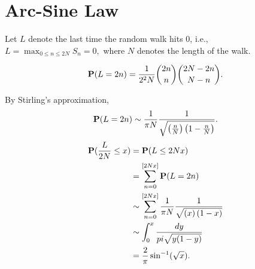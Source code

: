 \documentclass[main]{subfiles}
\begin{document}
\section{Arc-Sine Law}
Let $L$ denote the last time the random walk hits 0, i.e., $L=\max_{0\leq n \leq 2N} {S_n=0},$ where $N$ denotes the length of the walk.
\begin{theorem}
    $$\P(L=2n)=\frac{1}{2^2N}\binom{2n}{n}\binom{2N-2n}{N-n}.$$
    \label{thm:arcsin}
\end{theorem}
\begin{remark}
    By Stirling's approximation,
    $$\P(L=2n)\sim \frac{1}{\pi N}\frac{1}{\sqrt{\left(\frac{n}{N}\right)\left(1-\frac{n}{N}\right)}}.$$
    $$
        \begin{aligned}
            \P(\frac{L}{2N}\leq x) & =\P(L\leq 2Nx)                                                                         \\
                                   & =\sum_{n=0}^{[2Nx]}\P(L=2n)                                                            \\
                                   & \sim \sum_{n=0}^{[2Nx]} \frac{1}{\pi N}\frac{1}{\sqrt{\left(x\right)\left(1-x\right)}} \\
                                   & \sim \int_{0}^{x}\frac{dy}{pi\sqrt{y(1-y)}}                                            \\
                                   & =\frac{2}{\pi}\sin^{-1}(\sqrt{x}).
        \end{aligned}
    $$
\end{remark}
\end{document}
